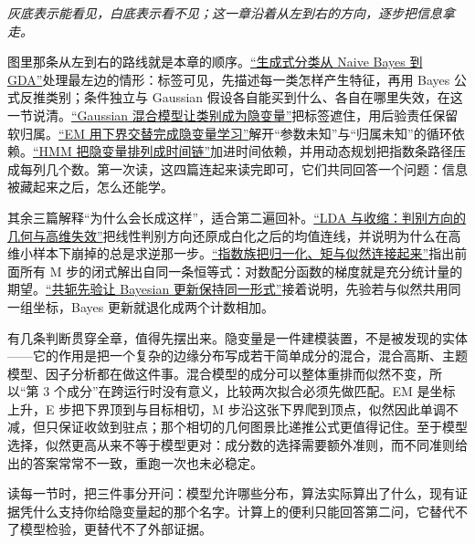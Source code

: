 \emph{灰底表示能看见，白底表示看不见；这一章沿着从左到右的方向，逐步把信息拿走。}

图里那条从左到右的路线就是本章的顺序。\hyperref[sec:13-Machine-Learning/06-Probabilistic-Models/01]{``生成式分类从 Naive Bayes 到 GDA''}处理最左边的情形：标签可见，先描述每一类怎样产生特征，再用 Bayes 公式反推类别；条件独立与 Gaussian 假设各自能买到什么、各自在哪里失效，在这一节说清。\hyperref[sec:13-Machine-Learning/06-Probabilistic-Models/03]{``Gaussian 混合模型让类别成为隐变量''}把标签遮住，用后验责任保留软归属。\hyperref[sec:13-Machine-Learning/06-Probabilistic-Models/04]{``EM 用下界交替完成隐变量学习''}解开``参数未知''与``归属未知''的循环依赖。\hyperref[sec:13-Machine-Learning/06-Probabilistic-Models/05]{``HMM 把隐变量排列成时间链''}加进时间依赖，并用动态规划把指数条路径压成每列几个数。第一次读，这四篇连起来读完即可，它们共同回答一个问题：信息被藏起来之后，怎么还能学。

其余三篇解释``为什么会长成这样''，适合第二遍回补。\hyperref[sec:13-Machine-Learning/06-Probabilistic-Models/02]{``LDA 与收缩：判别方向的几何与高维失效''}把线性判别方向还原成白化之后的均值连线，并说明为什么在高维小样本下崩掉的总是求逆那一步。\hyperref[sec:13-Machine-Learning/06-Probabilistic-Models/06]{``指数族把归一化、矩与似然连接起来''}指出前面所有 M 步的闭式解出自同一条恒等式：对数配分函数的梯度就是充分统计量的期望。\hyperref[sec:13-Machine-Learning/06-Probabilistic-Models/07]{``共轭先验让 Bayesian 更新保持同一形式''}接着说明，先验若与似然共用同一组坐标，Bayes 更新就退化成两个计数相加。

有几条判断贯穿全章，值得先摆出来。隐变量是一件建模装置，不是被发现的实体——它的作用是把一个复杂的边缘分布写成若干简单成分的混合，混合高斯、主题模型、因子分析都在做这件事。混合模型的成分可以整体重排而似然不变，所以``第 3 个成分''在跨运行时没有意义，比较两次拟合必须先做匹配。EM 是坐标上升，E 步把下界顶到与目标相切，M 步沿这张下界爬到顶点，似然因此单调不减，但只保证收敛到驻点；那个相切的几何图景比递推公式更值得记住。至于模型选择，似然更高从来不等于模型更对：成分数的选择需要额外准则，而不同准则给出的答案常常不一致，重跑一次也未必稳定。

读每一节时，把三件事分开问：模型允许哪些分布，算法实际算出了什么，现有证据凭什么支持你给隐变量起的那个名字。计算上的便利只能回答第二问，它替代不了模型检验，更替代不了外部证据。
